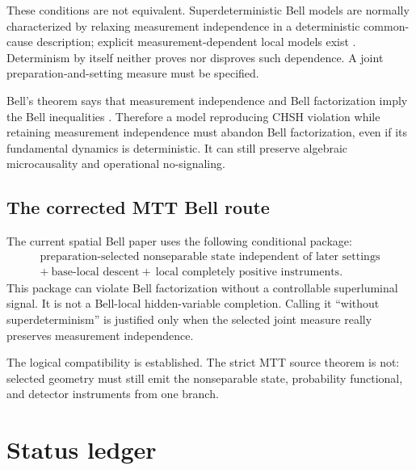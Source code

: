 \documentclass[11pt]{article}
\begin{document}
These conditions are not equivalent. Superdeterministic Bell models are
normally characterized by relaxing measurement independence in a
deterministic common-cause description; explicit measurement-dependent local
models exist \cite{Hall2010}. Determinism by itself neither proves nor
disproves such dependence. A joint preparation-and-setting measure must be
specified.

Bell's theorem says that measurement independence and Bell factorization
imply the Bell inequalities \cite{Bell1964}. Therefore a model reproducing
CHSH violation while retaining measurement independence must abandon Bell
factorization, even if its fundamental dynamics is deterministic. It can
still preserve algebraic microcausality and operational no-signaling.

\subsection{The corrected MTT Bell route}

The current spatial Bell paper uses the following conditional package:
\[
\boxed{
\begin{gathered}
\text{preparation-selected nonseparable state independent of later settings}\\
+\ \text{base-local descent}
+\ \text{local completely positive instruments}.
\end{gathered}
}
\]
This package can violate Bell factorization without a controllable
superluminal signal. It is not a Bell-local hidden-variable completion.
Calling it ``without superdeterminism'' is justified only when the selected
joint measure really preserves measurement independence.

The logical compatibility is established. The strict MTT source theorem is
not: selected geometry must still emit the nonseparable state, probability
functional, and detector instruments from one branch.

\section{Status ledger}
\end{document}
